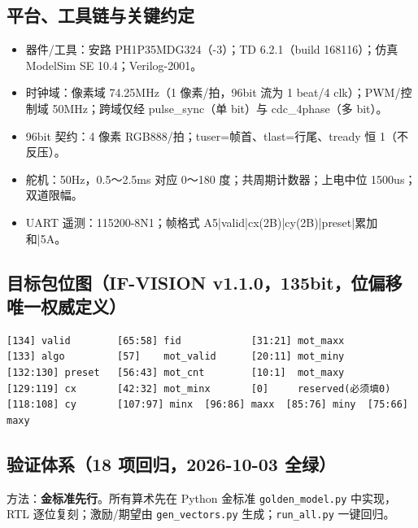 \documentclass[10pt]{ctexart}
\newcommand{\code}[1]{\texttt{#1}}
\begin{document}
\subsection{平台、工具链与关键约定}

\begin{itemize}
  \item 器件/工具：安路 PH1P35MDG324（-3）；TD 6.2.1（build 168116）；仿真 ModelSim SE 10.4；Verilog-2001。
  \item 时钟域：像素域 74.25MHz（1 像素/拍，96bit 流为 1 beat/4 clk）；PWM/控制域 50MHz；跨域仅经 pulse\_sync（单 bit）与 cdc\_4phase（多 bit）。
  \item 96bit 契约：4 像素 RGB888/拍；tuser=帧首、tlast=行尾、tready 恒 1（不反压）。
  \item 舵机：50Hz，0.5～2.5ms 对应 0～180 度；共周期计数器；上电中位 1500us；双道限幅。
  \item UART 遥测：115200-8N1；帧格式 A5|valid|cx(2B)|cy(2B)|preset|累加和|5A。
\end{itemize}

\subsection{目标包位图（IF-VISION v1.1.0，135bit，位偏移唯一权威定义）}

\begin{Verbatim}[frame=single,fontsize=\small,breaklines=true,breakanywhere=true]
[134] valid        [65:58] fid            [31:21] mot_maxx
[133] algo         [57]    mot_valid      [20:11] mot_miny
[132:130] preset   [56:43] mot_cnt        [10:1]  mot_maxy
[129:119] cx       [42:32] mot_minx       [0]     reserved(必须填0)
[118:108] cy       [107:97] minx  [96:86] maxx  [85:76] miny  [75:66] maxy
\end{Verbatim}

\subsection{验证体系（18 项回归，2026-10-03 全绿）}

方法：\textbf{金标准先行}。所有算术先在 Python 金标准 \code{golden\_model.py} 中实现，
RTL 逐位复刻；激励/期望由 \code{gen\_vectors.py} 生成；\code{run\_all.py} 一键回归。
\end{document}
